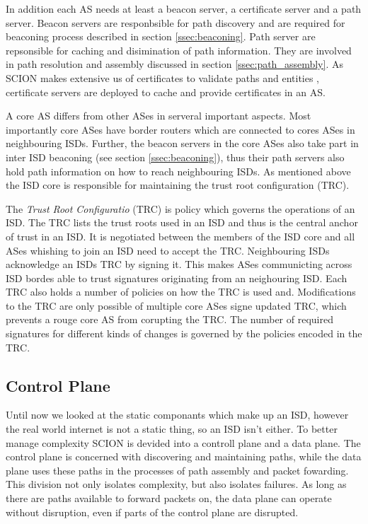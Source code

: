 \documentclass[../eva1_scion.tex]{subfiles}
\begin{document}
    In addition each AS needs at least a beacon server, a certificate server and a path server. Beacon servers are responbsible for path discovery and are required for beaconing process described in section \ref{ssec:beaconing}. Path server are repsonsible for caching and disimination of path information. They are involved in path resolution and assembly discussed in section \ref{ssec:path_assembly}. As SCION makes extensive us of certificates to validate paths and entities \cite{scion_2011}, certificate servers are deployed to cache and provide certificates in an AS.

    A core AS differs from other ASes in serveral important aspects. Most importantly core ASes have border routers which are connected to cores ASes in neighbouring ISDs. Further, the beacon servers in the core ASes also take part in inter ISD beaconing (see section \ref{ssec:beaconing}), thus their path servers also hold path information on how to reach neighbouring ISDs. As mentioned above the ISD core is responsible for maintaining the trust root configuration (TRC).

    The \textit{Trust Root Configuratio} (TRC) is policy which governs the operations of an ISD. The TRC lists the trust roots used in an ISD and thus is the central anchor of trust in an ISD. It is negotiated between the members of the ISD core and all ASes whishing to join an ISD need to accept the TRC. Neighbouring ISDs acknowledge an ISDs TRC by signing it. This makes ASes communicting across ISD bordes able to trust signatures originating from an neighouring ISD. Each TRC also holds a number of policies on how the TRC is used and. Modifications to the TRC are only possible of multiple core ASes signe updated TRC, which prevents a rouge core AS from corupting the TRC. The number of required signatures for different kinds of changes is governed by the policies encoded in the TRC.

    \subsection{Control Plane}
    Until now we looked at the static componants which make up an ISD, however the real world internet is not a static thing, so an ISD isn't either. To better manage complexity SCION is devided into a controll plane and a data plane. The control plane is concerned with discovering and maintaining paths, while the data plane uses these paths in the processes of path assembly and packet fowarding. This division not only isolates complexity, but also isolates failures. As long as there are paths available to forward packets on, the data plane can operate without disruption, even if parts of the control plane are disrupted.
\end{document}
